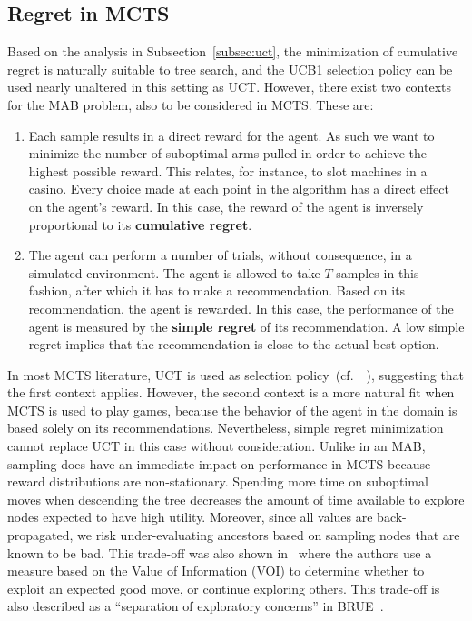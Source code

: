 \documentclass[a4paper]{llncs}
\newcommand{\cf}{{cf.}~}
\begin{document}
\subsection{Regret in MCTS}
\label{subsec:reg_mcts}

Based on the analysis in Subsection~\ref{subsec:uct}, the minimization of cumulative regret is naturally suitable to tree search, and the UCB1 selection policy can be used nearly unaltered in this setting as UCT. However, there exist two contexts for the MAB problem, also to be considered in MCTS. These are:

\begin{enumerate}

\item Each sample results in a direct reward for the agent. As such we want to minimize the number of suboptimal arms pulled in order to achieve the highest possible reward. This relates, for instance, to slot machines in a casino. Every choice made at each point in the algorithm has a direct effect on the agent's reward. In this case, the reward of the agent is inversely proportional to its \textbf{cumulative regret}.

\item The agent can perform a number of trials, without consequence, in a simulated environment. The agent is allowed to take $T$ samples in this fashion, after which it has to make a recommendation. Based on its recommendation, the agent is rewarded. In this case, the performance of the agent is measured by the \textbf{simple regret} of its recommendation. A low simple regret implies that the recommendation is close to the actual best option.

\end{enumerate}

In most MCTS literature, UCT is used as selection policy~(\cf~\cite{browne2012survey}), suggesting that the first context applies. However, the second context is a more natural fit when MCTS is used to play games, because the behavior of the agent in the domain is based solely on its recommendations. Nevertheless, simple regret minimization cannot replace UCT in this case without consideration. Unlike in an MAB, sampling does have an immediate impact on performance in MCTS
because reward distributions are non-stationary. 
Spending more time on suboptimal moves when descending the tree decreases the amount of time available to explore nodes expected to have high utility. Moreover, since all values are back-propagated, we risk under-evaluating ancestors based on sampling nodes that are known to be bad. This trade-off was also shown in~\cite{tolpin2012mcts} where the authors use a measure based on the Value of Information (VOI) to determine whether to exploit an expected good move, or continue exploring others. 
This trade-off is also described as a ``separation of exploratory concerns'' in BRUE~\cite{Feldman12BRUE}.
\end{document}
